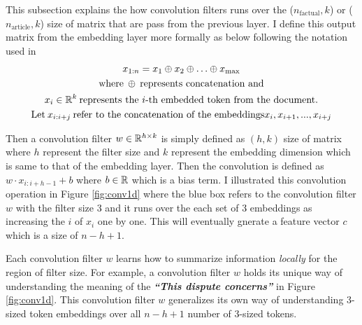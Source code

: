 \documentclass[12pt,letterpaper]{article}
\begin{document}
This subsection explains the how convolution filters runs over the ($n_{\text{factual}}, k$) or ($n_{\text{article}}, k$) size of matrix that are pass from the previous layer.
I define this output matrix from the embedding layer more formally as below following the notation used in \cite{textcnn}
\begin{gather}
  \nonumber x_{1:n} = x_1 \oplus x_2 \oplus \ldots \oplus x_{\text{max}}\\
  \nonumber \text{where\:} \oplus \: \text{represents concatenation and} \\
  \nonumber x_i \in \Bbb R^k \: \text{represents the $i$-th embedded token from the document.}\\
  \nonumber \text{Let} \: x_{i:i+j} \: \text{refer to the concatenation of the embeddings} x_i, x_{i+1}, . . . , x_{i+j}
\end{gather}


\noindent Then a convolution filter $w \in \Bbb R^{h \times k}$ is simply defined as $(h, k)$ size of matrix where $h$ represent the filter size and $k$ represent the embedding dimension which is same to that of the embedding layer.
Then the convolution is defined as $w \cdot x_{i:i+h-1} + b$ where $b \in \Bbb R$ which is a bias term.
I illustrated this convolution operation in Figure \ref{fig:conv1d} where the blue box refers to the convolution filter $w$ with the filter size 3 and it runs over the
each set of 3 embeddings as increasing the $i$ of $x_i$ one by one. This will eventually gnerate a feature vector $c$ which is a size of $n-h+1$.

Each convolution filter $w$ learns how to summarize information \textit{locally} for the region of filter size. For example, a convolution filter $w$ holds its unique way of
understanding the meaning of the \textit{\textbf{``This dispute concerns''}} in Figure \ref{fig:conv1d}.
This convolution filter $w$ generalizes its own way of understanding 3-sized token embeddings over all $n-h+1$ number of 3-sized tokens.
\end{document}
